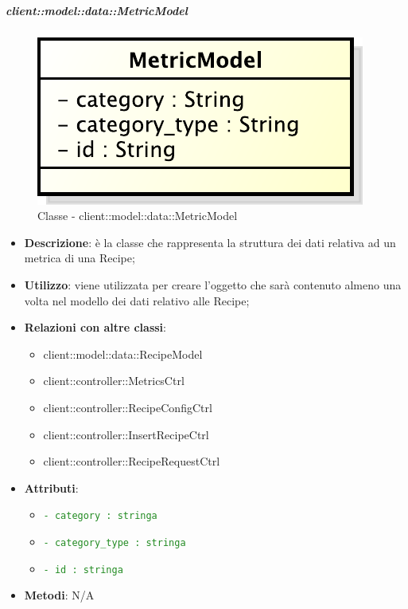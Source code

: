 		\subparagraph{client::model::data::MetricModel} %
		\label{subp:client_model_data_metricmodel}
			\begin{figure}[htbp]
				\centering
				\centerline{\includegraphics[scale=0.7]{./images/client/classes/model/metric_model.pdf}}
				\caption{Classe - client::model::data::MetricModel}
			\end{figure}
			\begin{itemize}
				\item \textbf{Descrizione}: è la classe che rappresenta la struttura dei dati relativa ad un metrica di una Recipe;
				\item \textbf{Utilizzo}: viene utilizzata per creare l'oggetto che sarà contenuto almeno una volta nel modello dei dati relativo alle Recipe;
				\item \textbf{Relazioni con altre classi}:
					\begin{itemize}
						\item client::model::data::RecipeModel
						\item client::controller::MetricsCtrl
						\item client::controller::RecipeConfigCtrl
						\item client::controller::InsertRecipeCtrl
						\item client::controller::RecipeRequestCtrl
					\end{itemize}
				\item \textbf{Attributi}:
					\begin{itemize}
						\item \textcolor{forestgreen}{\texttt{- category : stringa}}
						\item \textcolor{forestgreen}{\texttt{- category\_type : stringa}}
						\item \textcolor{forestgreen}{\texttt{- id : stringa}}
					\end{itemize}
				\item \textbf{Metodi}: N/A
			\end{itemize}
